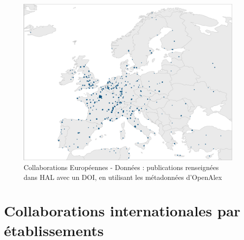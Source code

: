 \documentclass[french, 11pt]{dibiso/biso}
\begin{document}
\begin{figure}[!h]
  \includegraphics[width=\textwidth]{figures/collaboration_map_europe.pdf}
  \caption{Collaborations Européennes - Données : publications renseignées dans HAL avec un DOI, en utilisant les métadonnées d'OpenAlex}
  \label{fig_collab_map_europe}
\end{figure}

{\footnotesize\collaborationmapeuropeinfo}

\pagebreak

\section{Collaborations internationales par établissements}
\end{document}

